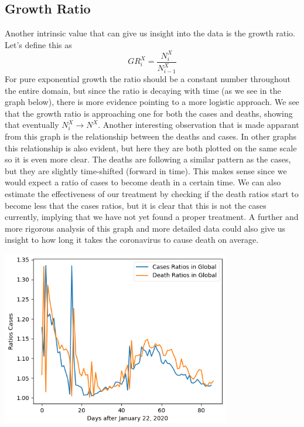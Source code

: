 \documentclass{report}
\begin{document}
        \subsection{Growth Ratio}
        Another intrinsic value that can give us insight into the data is the growth ratio. Let's define this as
        \begin{equation}
            GR^X_i = \dfrac{N^X_i}{N^X_{i - 1}}
        \end{equation}
        For pure exponential growth the ratio should be a constant number throughout the entire domain, but since the ratio is decaying with time (as we see in the graph below), there is more evidence pointing to a more logistic approach. We see that the growth ratio is approaching one for both the cases and deaths, showing that eventually $N^X_i \rightarrow N^X$.
        \newline
        \indent Another interesting observation that is made apparant from this graph is the relationship between the deaths and cases. In other graphs this relationship is also evident, but here they are both plotted on the same scale so it is even more clear. The deaths are following a similar pattern as the cases, but they are slightly time-shifted (forward in time). This makes sense since we would expect a ratio of cases to become death in a certain time.
        \newline
        \indent We can also estimate the effectiveness of our treatment by checking if the death ratios start to become less that the cases ratios, but it is clear that this is not the cases currently, implying that we have not yet found a proper treatment.
        \newline
        \indent A further and more rigorous analysis of this graph and more detailed data could also give us insight to how long it takes the coronavirus to cause death on average.
        \begin{center}
            \includegraphics[width=10cm]{plots/global/growth_ratios.png}
        \end{center}
\end{document}
